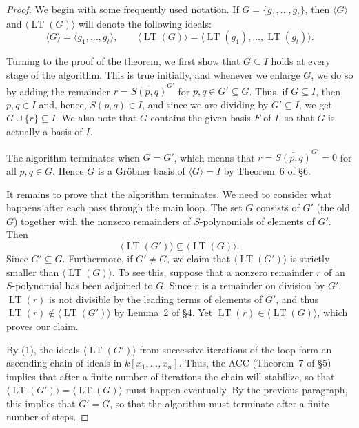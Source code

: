 \begin{proof}
  \leanok
  We begin with some frequently used notation. If $G = \{ g_1, \ldots, g_t \}$, 
  then $\langle G \rangle$ and $\langle \operatorname{LT}(G) \rangle$ will denote the following ideals:
  \[
  \langle G \rangle = \langle g_1, \ldots, g_t \rangle, \qquad
  \langle \operatorname{LT}(G) \rangle = \langle \operatorname{LT}(g_1), \ldots, \operatorname{LT}(g_t) \rangle.
  \]

  Turning to the proof of the theorem, we first show that $G \subseteq I$ holds at every stage of
  the algorithm. This is true initially, and whenever we enlarge $G$, we do so by adding the remainder
  $r = \overline{S(p,q)}^{G'}$ for $p,q \in G' \subseteq G$. Thus, if $G \subseteq I$, then $p,q \in I$ and, 
  hence, $S(p,q) \in I$, and since we are dividing by $G' \subseteq I$, we get $G \cup \{r\} \subseteq I$. 
  We also note that $G$ contains the given basis $F$ of $I$, so that $G$ is actually a basis of $I$.

  The algorithm terminates when $G = G'$, which means that 
  $r = \overline{S(p,q)}^{G'} = 0$ for all $p,q \in G$. Hence $G$ is a Gr\"obner basis of 
  $\langle G \rangle = I$ by Theorem~6 of \S6.

  It remains to prove that the algorithm terminates. We need to consider what happens after each
  pass through the main loop. The set $G$ consists of $G'$ (the old $G$) together with the nonzero
  remainders of $S$-polynomials of elements of $G'$. Then
  \begin{equation}
  \langle \operatorname{LT}(G') \rangle \subseteq \langle \operatorname{LT}(G) \rangle.
  \end{equation}
  Since $G' \subseteq G$. Furthermore, if $G' \ne G$, we claim that 
  $\langle \operatorname{LT}(G') \rangle$ is strictly smaller than $\langle \operatorname{LT}(G) \rangle$. 
  To see this, suppose that a nonzero remainder $r$ of an $S$-polynomial has been adjoined to $G$. 
  Since $r$ is a remainder on division by $G'$, $\operatorname{LT}(r)$ is not divisible by the leading
  terms of elements of $G'$, and thus $\operatorname{LT}(r) \notin \langle \operatorname{LT}(G') \rangle$ 
  by Lemma~2 of \S4. Yet $\operatorname{LT}(r) \in \langle \operatorname{LT}(G) \rangle$, which proves our claim.

  By (1), the ideals $\langle \operatorname{LT}(G') \rangle$ from successive iterations of the loop form an
  ascending chain of ideals in $k[x_1, \ldots, x_n]$. Thus, the ACC (Theorem~7 of \S5) implies that after
  a finite number of iterations the chain will stabilize, so that 
  $\langle \operatorname{LT}(G') \rangle = \langle \operatorname{LT}(G) \rangle$ must happen eventually. 
  By the previous paragraph, this implies that $G' = G$, so that the algorithm must terminate after a 
  finite number of steps.
\end{proof}

